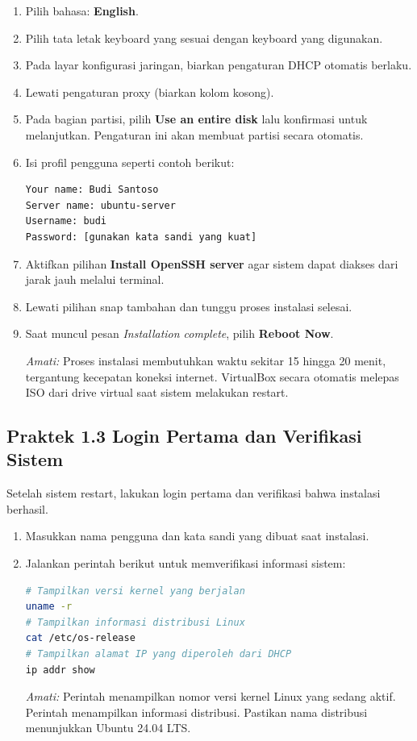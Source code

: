\begin{enumerate}
    \item Pilih bahasa: \textbf{English}.
    \item Pilih tata letak keyboard yang sesuai dengan keyboard yang digunakan.
    \item Pada layar konfigurasi jaringan, biarkan pengaturan DHCP otomatis berlaku.
    \item Lewati pengaturan proxy (biarkan kolom kosong).
    \item Pada bagian partisi, pilih \textbf{Use an entire disk} lalu konfirmasi untuk
    melanjutkan. Pengaturan ini akan membuat partisi secara otomatis.
    \item Isi profil pengguna seperti contoh berikut:
    \begin{lstlisting}[caption={Contoh isian profil pengguna}]
Your name: Budi Santoso
Server name: ubuntu-server
Username: budi
Password: [gunakan kata sandi yang kuat]
    \end{lstlisting}
    \item Aktifkan pilihan \textbf{Install OpenSSH server} agar sistem dapat diakses
    dari jarak jauh melalui terminal.
    \item Lewati pilihan snap tambahan dan tunggu proses instalasi selesai.
    \item Saat muncul pesan \textit{Installation complete}, pilih \textbf{Reboot Now}.

    \textit{Amati:} Proses instalasi membutuhkan waktu sekitar 15 hingga 20 menit,
    tergantung kecepatan koneksi internet. VirtualBox secara otomatis melepas ISO dari
    drive virtual saat sistem melakukan restart.
\end{enumerate}

\subsection*{Praktek 1.3 Login Pertama dan Verifikasi Sistem}

Setelah sistem restart, lakukan login pertama dan verifikasi bahwa instalasi berhasil.

\begin{enumerate}
    \item Masukkan nama pengguna dan kata sandi yang dibuat saat instalasi.
    \item Jalankan perintah berikut untuk memverifikasi informasi sistem:

    \begin{lstlisting}[language=bash, caption={Verifikasi informasi sistem}]
# Tampilkan versi kernel yang berjalan
uname -r
# Tampilkan informasi distribusi Linux
cat /etc/os-release
# Tampilkan alamat IP yang diperoleh dari DHCP
ip addr show
    \end{lstlisting}

    \textit{Amati:} Perintah  menampilkan nomor versi kernel Linux yang
    sedang aktif. Perintah  menampilkan informasi distribusi.
    Pastikan nama distribusi menunjukkan Ubuntu 24.04 LTS.
\end{enumerate}


